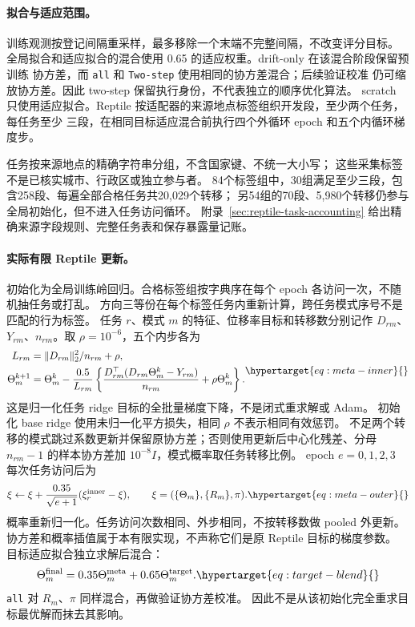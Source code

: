 \FloatBarrier
\paragraph{拟合与适应范围。}
训练观测按登记间隔重采样，最多移除一个末端不完整间隔，不改变评分目标。
全局拟合和适应拟合的混合使用 0.65 的适应权重。drift-only 在该混合阶段保留预训练
协方差，而 \texttt{all} 和 \texttt{Two-step} 使用相同的协方差混合；后续验证校准
仍可缩放协方差。因此 two-step 保留执行身份，不代表独立的顺序优化算法。
scratch 只使用适应拟合。Reptile 按适配器的来源地点标签组织开发段，至少两个任务，每任务至少
三段，在相同目标适应混合前执行四个外循环 epoch 和五个内循环梯度步。

任务按来源地点的精确字符串分组，不含国家键、不统一大小写；
这些采集标签不是已核实城市、行政区或独立参与者。
84个标签组中，30组满足至少三段，包含258段、每遍全部合格任务共20,029个转移；
另54组的70段、5,980个转移仍参与全局初始化，但不进入任务访问循环。
附录~\ref{sec:reptile-task-accounting} 给出精确来源字段规则、完整任务表和保存暴露量记账。

\paragraph{实际有限 Reptile 更新。}
初始化为全局训练岭回归。合格标签组按字典序在每个 epoch 各访问一次，不随机抽任务或打乱。
方向三等份在每个标签任务内重新计算，跨任务模式序号不是匹配的行为标签。
任务 \(r\)、模式 \(m\) 的特征、位移率目标和转移数分别记作
\(D_{rm}\)、\(Y_{rm}\)、\(n_{rm}\)。取 \(\rho=10^{-6}\)，五个内步各为
\begin{equation}
\begin{aligned}
L_{rm}&=\|D_{rm}\|_2^2/n_{rm}+\rho,\\
\Theta_m^{k+1}&=\Theta_m^k-\frac{0.5}{L_{rm}}
\left\{\frac{D_{rm}^{\top}(D_{rm}\Theta_m^k-Y_{rm})}{n_{rm}}
                 +\rho\Theta_m^k\right\}.
\end{aligned}
\label{eq:meta-inner}\hypertarget{eq:meta-inner}{}
\end{equation}
这是归一化任务 ridge 目标的全批量梯度下降，不是闭式重求解或 Adam。
初始化 base ridge 使用未归一化平方损失，相同 \(\rho\) 不表示相同有效惩罚。
不足两个转移的模式跳过系数更新并保留原协方差；否则使用更新后中心化残差、分母
\(n_{rm}-1\) 的样本协方差加 \(10^{-8}I\)，模式概率取任务转移比例。
epoch \(e=0,1,2,3\) 每次任务访问后为
\begin{equation}
\xi\leftarrow\xi+\frac{0.35}{\sqrt{e+1}}(\xi_r^{\rm inner}-\xi),
\qquad\xi=(\{\Theta_m\},\{R_m\},\pi).
\label{eq:meta-outer}\hypertarget{eq:meta-outer}{}
\end{equation}
概率重新归一化。任务访问次数相同、外步相同，不按转移数做 pooled 外更新。
协方差和概率插值属于本有限实现，不声称它们是原 Reptile 目标的梯度参数。
目标适应拟合独立求解后混合：
\begin{equation}
\Theta_m^{\rm final}=0.35\Theta_m^{\rm meta}+0.65\Theta_m^{\rm target}.
\label{eq:target-blend}\hypertarget{eq:target-blend}{}
\end{equation}
\texttt{all} 对 \(R_m\)、\(\pi\) 同样混合，再做验证协方差校准。
因此不是从该初始化完全重求目标最优解而抹去其影响。

